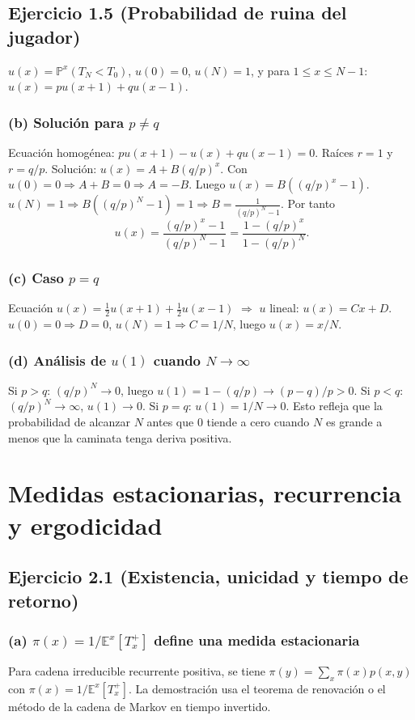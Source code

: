 \documentclass[letterpaper, 12pt]{article}
\newcommand{\E}{\mathbb{E}}
\renewcommand{\P}{\mathbb{P}}
\newcommand{\1}{\mathbbm{1}}
\begin{document}
    \subsection{Ejercicio 1.5 (Probabilidad de ruina del jugador)}

    $u(x)=\P^x(T_N<T_0)$, $u(0)=0$, $u(N)=1$, y para $1\le x\le N-1$: $u(x)=pu(x+1)+qu(x-1)$.

    \subsubsection*{(b) Soluci\'on para $p\neq q$}
    Ecuaci\'on homog\'enea: $pu(x+1)-u(x)+qu(x-1)=0$. Ra\'ices $r=1$ y $r=q/p$. Soluci\'on: $u(x)=A+B(q/p)^x$. Con $u(0)=0\Rightarrow A+B=0\Rightarrow A=-B$. Luego $u(x)=B((q/p)^x-1)$. $u(N)=1\Rightarrow B((q/p)^N-1)=1\Rightarrow B=\frac{1}{(q/p)^N-1}$. Por tanto
    \[
    u(x)=\frac{(q/p)^x-1}{(q/p)^N-1}=\frac{1-(q/p)^x}{1-(q/p)^N}.
    \]

    \subsubsection*{(c) Caso $p=q$}
    Ecuaci\'on $u(x)=\frac12u(x+1)+\frac12u(x-1)$ $\Rightarrow$ $u$ lineal: $u(x)=Cx+D$. $u(0)=0\Rightarrow D=0$, $u(N)=1\Rightarrow C=1/N$, luego $u(x)=x/N$.

    \subsubsection*{(d) An\'alisis de $u(1)$ cuando $N\to\infty$}
    Si $p>q$: $(q/p)^N\to0$, luego $u(1)=1-(q/p)\to (p-q)/p>0$. Si $p<q$: $(q/p)^N\to\infty$, $u(1)\to0$. Si $p=q$: $u(1)=1/N\to0$. Esto refleja que la probabilidad de alcanzar $N$ antes que $0$ tiende a cero cuando $N$ es grande a menos que la caminata tenga deriva positiva.

    \section{Medidas estacionarias, recurrencia y ergodicidad}

    \subsection{Ejercicio 2.1 (Existencia, unicidad y tiempo de retorno)}

    \subsubsection*{(a) $\pi(x)=1/\E^x[T_x^+]$ define una medida estacionaria}
    Para cadena irreducible recurrente positiva, se tiene $\pi(y)=\sum_x\pi(x)p(x,y)$ con $\pi(x)=1/\E^x[T_x^+]$. La demostraci\'on usa el teorema de renovaci\'on o el m\'etodo de la cadena de Markov en tiempo invertido.
\end{document}
